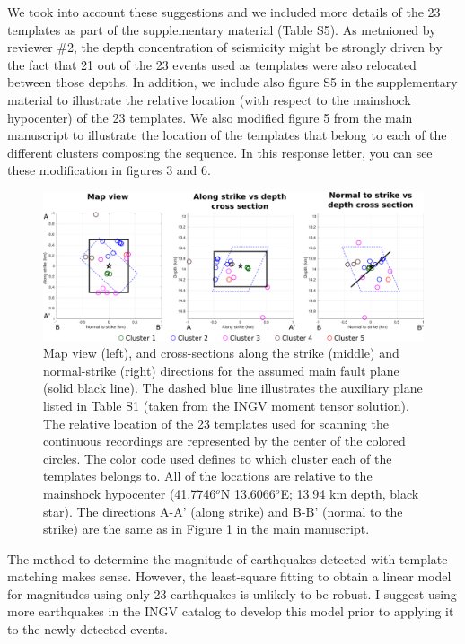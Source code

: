 \documentclass[10pt]{extarticle}
\begin{document}
\begin{Answer}
We took into account these suggestions and we included more details of the 23 templates as part of the supplementary material (Table S5). As metnioned by reviewer \#2, the depth concentration of seismicity might be strongly driven by the fact that 21 out of the 23 events used as templates were also relocated between those depths. In addition, we include also figure S5 in the supplementary material to illustrate the relative location (with respect to the mainshock hypocenter) of the 23 templates. We also modified figure 5 from the main manuscript to illustrate the location of the templates that belong to each of the different clusters composing the sequence. In this response letter, you can see these modification in figures 3 and 6.
\begin{figure}[!h]
\begin{center}
 \includegraphics[width=1\linewidth]{S6_templates_per_cluster_map.pdf} 
\end{center}
\caption{Map view (left), and cross-sections along the strike (middle) and normal-strike (right) directions for the assumed main fault plane (solid black line). The dashed blue line illustrates the auxiliary plane listed in Table S1 (taken from the INGV moment tensor solution). The relative location of the 23 templates used for scanning the continuous recordings are represented by the center of the colored circles. The color code used defines to which cluster each of the templates belongs to. All of the locations are relative to the mainshock hypocenter (41.7746$^o$N 13.6066$^o$E; 13.94 km depth, black star). The directions A-A' (along strike) and B-B' (normal to the strike) are the same as in Figure 1 in the main manuscript.}
\label{fig:S6_templates_map}
\end{figure}
 \WorkInProgressRevTask
\end{Answer}
%
%



\begin{ReviewerComment}{2}
\noindent 
The method to determine the magnitude of earthquakes detected with template matching makes sense. However, the least-square fitting to obtain a linear model for magnitudes using only 23 earthquakes is unlikely to be robust. I suggest using more earthquakes in the INGV catalog to develop this model prior to applying it to the newly detected events.
\end{ReviewerComment}
\end{document}
